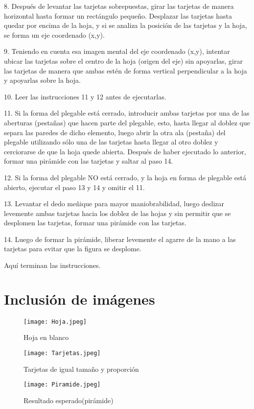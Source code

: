 \documentclass{article}
\begin{document}
8. Después de levantar las tarjetas sobrepuestas, girar las tarjetas de manera horizontal hasta formar un rectángulo pequeño. Desplazar las tarjetas hasta quedar por encima de la hoja, y si se analiza la posición de las tarjetas y la hoja, se forma un eje coordenado (x,y).

9. Teniendo en cuenta esa imagen mental del eje coordenado (x,y), intentar ubicar las tarjetas sobre el centro de la hoja (origen del eje) sin apoyarlas, girar las tarjetas de manera que ambas estén de forma vertical perpendicular a la hoja y apoyarlas sobre la hoja.

10. Leer las instrucciones 11 y 12 antes de ejecutarlas.

11. Si la forma del plegable está cerrado, introducir ambas tarjetas por una de las aberturas (pestañas) que hacen parte del plegable, esto, hasta llegar al doblez que separa las paredes de dicho elemento, luego abrir la otra ala (pestaña) del plegable utilizando sólo una de las tarjetas hasta llegar al otro doblez y cerciorarse de que la hoja quede abierta. Después de haber ejecutado lo anterior, formar una pirámide con las tarjetas y saltar al paso 14.

12. Si la forma del plegable NO está cerrado, y la hoja en forma de plegable está abierto, ejecutar el paso 13 y 14 y omitir el 11.

13. Levantar el dedo meñique para mayor maniobrabilidad, luego deslizar levemente ambas tarjetas hacia los doblez de las hojas y sin permitir que se desplomen las tarjetas, formar una pirámide con las tarjetas.

14. Luego de formar la pirámide, liberar levemente el agarre de la mano a las tarjetas para evitar que la figura se desplome. 

Aquí terminan las instrucciones.

\section{Inclusión de imágenes} \label{imagenes}
\begin{figure}[h]
\texttt{[image: Hoja.jpeg]}
\centering
\caption{Hoja en blanco}
\label{fig:Hoja}
\end{figure}
\begin{figure}[h]
\texttt{[image: Tarjetas.jpeg]}
\centering
\caption{Tarjetas de igual tamaño y proporción}
\label{fig:Tarjetas}
\end{figure}
\begin{figure}[h]
\texttt{[image: Piramide.jpeg]}
\centering
\caption{Resultado esperado(pirámide)}
\label{fig:Piramide}
\end{figure}
\end{document}
